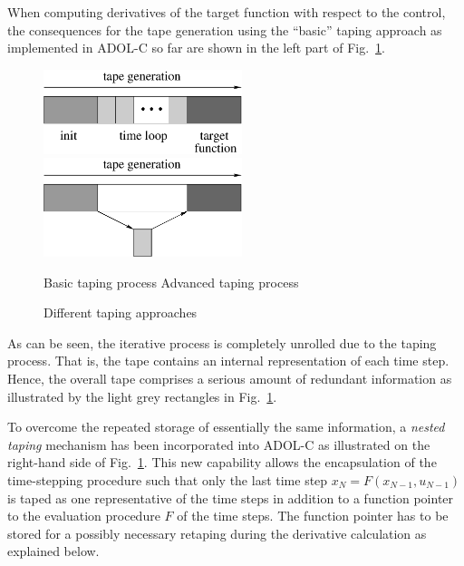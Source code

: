 \documentclass[11pt,twoside]{article}
\begin{document}
When computing derivatives of the target function with respect to the
control, the consequences for the tape generation using the ``basic''
taping approach as implemented in ADOL-C so far are shown in the left part of
Fig.~\ref{fig:bas_tap}. 
\begin{figure}[htbp]  
\begin{center}
\hspace*{0.5cm}\includegraphics[width=5.8cm]{tapebasic.eps}\hfill
\includegraphics[width=5.8cm]{tapeadv.eps} \hspace*{0.5cm}\ 
\end{center}
\hspace*{0.8cm} Basic taping process \hspace*{4.3cm} Advanced taping process
\caption{Different taping approaches}
\label{fig:bas_tap}
\end{figure} 
As can be seen, the iterative process is completely
unrolled due to the taping process. That is, the tape contains an internal representation of each 
time step. Hence, the overall tape comprises a serious amount of redundant
information as illustrated by the light grey rectangles in
Fig.~\ref{fig:bas_tap}.  

To overcome the repeated storage of essentially the same information, 
a {\em nested taping} mechanism has been incorporated into ADOL-C as illustrated on
the right-hand side of Fig.~\ref{fig:bas_tap}. This new
capability allows the encapsulation of the time-stepping procedure
such that only the last time step $x_{N} = F(x_{N-1},u_{N-1})$ is taped as one
representative of the time steps in addition to a function pointer to the 
evaluation procedure $F$ of the time steps.  The function pointer has
to be stored for a possibly necessary retaping during the derivative calculation
as explained below. 
\end{document}
